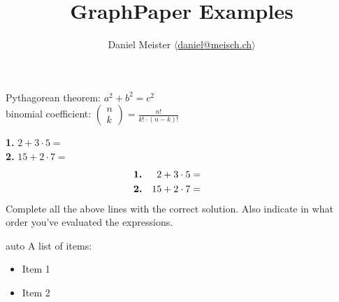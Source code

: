 \documentclass[11pt,a4paper,fleqn]{scrartcl}
\title{GraphPaper Examples}
\author{Daniel Meister $\langle$\href{mailto:daniel@meisch.ch}{daniel@meisch.ch}$\rangle$}
\begin{document}
\maketitle
\centering

\begin{graphpaper}{40}{10}
  Pythagorean theorem: \boldmath $a^2 + b^2 = c^2$\unboldmath\\[1\baselineskip]
  binomial coefficient: $\left(\begin{array}{c} n \\ k\end{array}\right) = \displaystyle\frac{n!}{k!\cdot\left(n-k\right)!}$
\end{graphpaper}

\begin{graphpaper}{\gpconvert{13cm}}{\gpconvert{5cm}}
  \textbf{1.} $2 + 3 \cdot 5 = $\\
  \textbf{2.} $15 + 2 \cdot 7 = $
  \begin{align*}
  \text{\bf 1.} & & 2 + 3 \cdot 5 & = &&&&&\\
  \text{\bf 2.} & & 15 + 2 \cdot 7 & = &&&&&
  \end{align*}
  Complete all the above lines with the correct solution. Also indicate in what order you've evaluated the expressions.
\end{graphpaper}

\begin{graphpaper}{\gpconvert{\textwidth}}{auto}
  A list of items:
  \begin{itemize}
  \item Item 1
  \item Item 2
  \end{itemize}
  \blindtext
\end{graphpaper}
\end{document}
